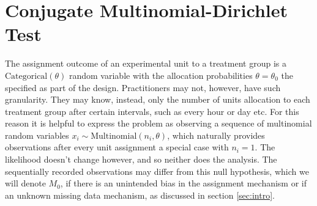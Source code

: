 \documentclass[11pt]{article}
\begin{document}
\section{Conjugate Multinomial-Dirichlet Test}
\label{sec:srm_testing}
The assignment outcome of an experimental unit to a treatment group is a $\text{Categorical}(\theta)$ random variable with the allocation probabilities $\theta=\theta_0$ the specified as part of the design. Practitioners may not, however, have such granularity. They may know, instead, only the number of units allocation to each treatment group after certain intervals, such as every hour or day etc. For this reason it is helpful to express the problem as observing a sequence of multinomial random variables $x_i \sim \text{Multinomial}(n_i, \theta)$, which naturally provides observations after every unit assignment a special case with $n_i = 1$. The likelihood doesn't change however, and so neither does the analysis.
The sequentially recorded observations may differ from this null hypothesis, which we will denote $M_0$, if there is an unintended bias in the assignment mechanism or if an unknown missing data mechanism, as discussed in section \ref{sec:intro}.
\end{document}
